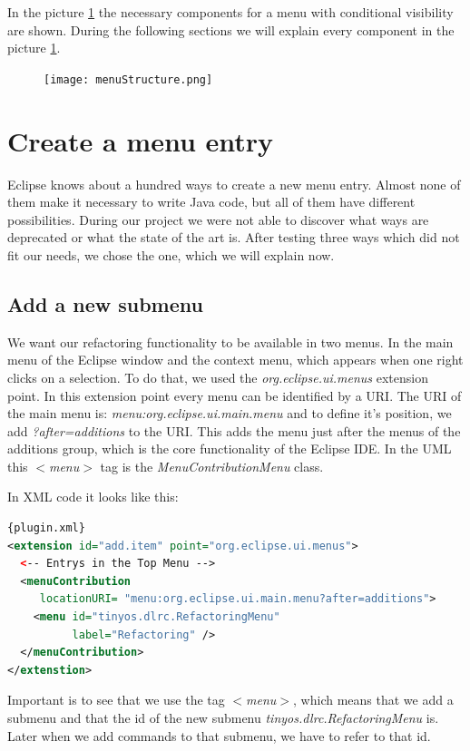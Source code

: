 \documentclass[a4paper,10pt]{report}
\begin{document}
In the picture \ref{menuStructure} the necessary components for a menu with conditional visibility are shown.
During the following sections we will explain every component in the picture \ref{menuStructure}.
\begin{figure}[h]
\centering
\texttt{[image: menuStructure.png]}
\label{menuStructure} 
\end{figure}

\section{Create a menu entry}
Eclipse knows about a hundred ways to create a new menu entry.
Almost none of them make it necessary to write Java code, but all of them have different possibilities. 
During our project we were not able to discover what ways are deprecated or what the state of the art is.
After testing three ways which did not fit our needs, we chose the one, which we will explain now. 

\subsection{Add a new submenu}
We want our refactoring functionality to be available in two menus. 
In the main menu of the Eclipse window and the context menu, which appears when one right clicks on a selection.
To do that, we used the {\it org.eclipse.ui.menus} extension point.
In this extension point every menu can be identified by a URI. The URI of the main menu is:
{\it menu:org.eclipse.ui.main.menu} and to define it's position, we add {\it ?after=additions} to the URI.
This adds the menu just after the menus of the additions group, which is the core functionality of the Eclipse IDE.
In the UML this {\it $<$menu$>$} tag is the {\it MenuContributionMenu} class.

In XML code it looks like this:
\begin{lstlisting}[language=XML,caption=Create menu folder ({\it plugin.xml})]{plugin.xml}
<extension id="add.item" point="org.eclipse.ui.menus">
  <-- Entrys in the Top Menu -->
  <menuContribution
     locationURI= "menu:org.eclipse.ui.main.menu?after=additions">
    <menu id="tinyos.dlrc.RefactoringMenu"
          label="Refactoring" />
  </menuContribution>
</extenstion>
\end{lstlisting}
Important is to see that we use the tag {\it $<$menu$>$}, which means that we add a submenu and that the id of the new submenu {\it tinyos.dlrc.RefactoringMenu} is. 
Later when we add commands to that submenu, we have to refer to that id.
\end{document}
